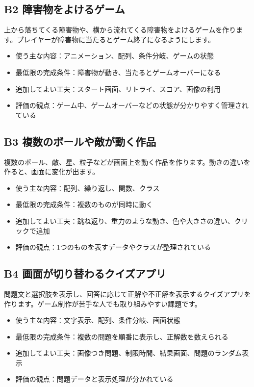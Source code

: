 \subsection{B2 障害物をよけるゲーム}

上から落ちてくる障害物や、横から流れてくる障害物をよけるゲームを作ります。プレイヤーが障害物に当たるとゲーム終了になるようにします。

\begin{itemize}
    \item 使う主な内容：アニメーション、配列、条件分岐、ゲームの状態
    \item 最低限の完成条件：障害物が動き、当たるとゲームオーバーになる
    \item 追加してよい工夫：スタート画面、リトライ、スコア、画像の利用
    \item 評価の観点：ゲーム中、ゲームオーバーなどの状態が分かりやすく管理されている
\end{itemize}

\subsection{B3 複数のボールや敵が動く作品}

複数のボール、敵、星、粒子などが画面上を動く作品を作ります。動きの違いを作ると、画面に変化が出ます。

\begin{itemize}
    \item 使う主な内容：配列、繰り返し、関数、クラス
    \item 最低限の完成条件：複数のものが同時に動く
    \item 追加してよい工夫：跳ね返り、重力のような動き、色や大きさの違い、クリックで追加
    \item 評価の観点：1つのものを表すデータやクラスが整理されている
\end{itemize}

\subsection{B4 画面が切り替わるクイズアプリ}

問題文と選択肢を表示し、回答に応じて正解や不正解を表示するクイズアプリを作ります。ゲーム制作が苦手な人でも取り組みやすい課題です。

\begin{itemize}
    \item 使う主な内容：文字表示、配列、条件分岐、画面状態
    \item 最低限の完成条件：複数の問題を順番に表示し、正解数を数えられる
    \item 追加してよい工夫：画像つき問題、制限時間、結果画面、問題のランダム表示
    \item 評価の観点：問題データと表示処理が分かれている
\end{itemize}

